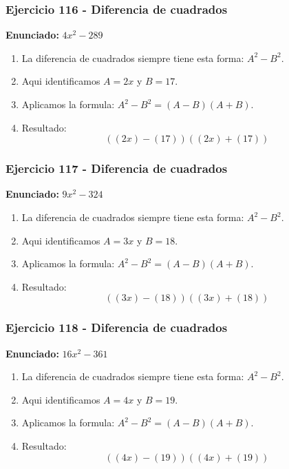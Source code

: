 \documentclass[11pt,a4paper]{article}
\begin{document}
\vspace{0.2cm}
\subsubsection*{Ejercicio 116 - Diferencia de cuadrados}
\textbf{Enunciado:} $ 4 x^{2} - 289 $\par
\begin{enumerate}[leftmargin=2em]
\item La diferencia de cuadrados siempre tiene esta forma: \(A^2-B^2\).
\item Aqui identificamos \(A=2 x\) y \(B=17\).
\item Aplicamos la formula: \(A^2-B^2=(A-B)(A+B)\).
\item Resultado: \[\boxed{\left(\left(2 x\right)-\left(17\right)\right)\left(\left(2 x\right)+\left(17\right)\right)}\]
\end{enumerate}

\vspace{0.2cm}
\subsubsection*{Ejercicio 117 - Diferencia de cuadrados}
\textbf{Enunciado:} $ 9 x^{2} - 324 $\par
\begin{enumerate}[leftmargin=2em]
\item La diferencia de cuadrados siempre tiene esta forma: \(A^2-B^2\).
\item Aqui identificamos \(A=3 x\) y \(B=18\).
\item Aplicamos la formula: \(A^2-B^2=(A-B)(A+B)\).
\item Resultado: \[\boxed{\left(\left(3 x\right)-\left(18\right)\right)\left(\left(3 x\right)+\left(18\right)\right)}\]
\end{enumerate}

\vspace{0.2cm}
\subsubsection*{Ejercicio 118 - Diferencia de cuadrados}
\textbf{Enunciado:} $ 16 x^{2} - 361 $\par
\begin{enumerate}[leftmargin=2em]
\item La diferencia de cuadrados siempre tiene esta forma: \(A^2-B^2\).
\item Aqui identificamos \(A=4 x\) y \(B=19\).
\item Aplicamos la formula: \(A^2-B^2=(A-B)(A+B)\).
\item Resultado: \[\boxed{\left(\left(4 x\right)-\left(19\right)\right)\left(\left(4 x\right)+\left(19\right)\right)}\]
\end{enumerate}
\end{document}
